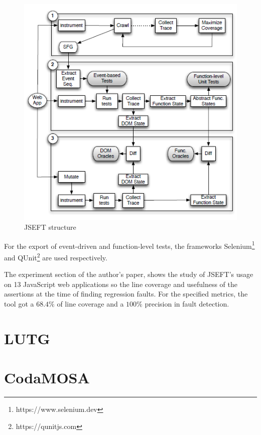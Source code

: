 \documentclass[%
  chapterprefix=false,%
  open=right,%
  twoside=true,%
  paper=a4,%
  logofile={Figures/logo.png},%
  thesistype=master,%
  UKenglish,%
]{se2thesis}
\begin{document}
\begin{figure}[tb]
  \centering 
  \includegraphics[width=.99\textwidth]{Figures/jseft.png}
  \caption{JSEFT structure}\label{fig:jseft}
\end{figure}

For the export of event-driven and function-level tests, the frameworks Selenium\footnote{https://www.selenium.dev} and QUnit\footnote{https://qunitjs.com} are used respectively.

The experiment section of the author's paper, shows the study of JSEFT's usage on 13 JavaScript web applications so the line coverage and usefulness of the assertions at the time of finding regression faults.
For the specified metrics, the tool got a \(68.4\%\) of line coverage and a \(100\%\) precision in fault detection.

\section{LUTG}

\section{CodaMOSA}
\end{document}
